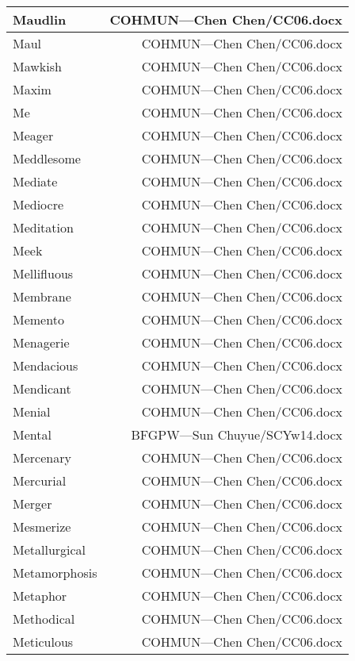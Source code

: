\documentclass{article}
\begin{document}
\begin{center}
\begin{longtable}{|l|r|}
\hline
Maudlin  &  COHMUN---Chen Chen/CC06.docx\\  
\hline
Maul  &  COHMUN---Chen Chen/CC06.docx\\  
\hline
Mawkish  &  COHMUN---Chen Chen/CC06.docx\\  
\hline
Maxim  &  COHMUN---Chen Chen/CC06.docx\\  
\hline
Me  &  COHMUN---Chen Chen/CC06.docx\\  
\hline
Meager  &  COHMUN---Chen Chen/CC06.docx\\  
\hline
Meddlesome  &  COHMUN---Chen Chen/CC06.docx\\  
\hline
Mediate  &  COHMUN---Chen Chen/CC06.docx\\  
\hline
Mediocre  &  COHMUN---Chen Chen/CC06.docx\\  
\hline
Meditation  &  COHMUN---Chen Chen/CC06.docx\\  
\hline
Meek  &  COHMUN---Chen Chen/CC06.docx\\  
\hline
Mellifluous  &  COHMUN---Chen Chen/CC06.docx\\  
\hline
Membrane  &  COHMUN---Chen Chen/CC06.docx\\  
\hline
Memento  &  COHMUN---Chen Chen/CC06.docx\\  
\hline
Menagerie  &  COHMUN---Chen Chen/CC06.docx\\  
\hline
Mendacious  &  COHMUN---Chen Chen/CC06.docx\\  
\hline
Mendicant  &  COHMUN---Chen Chen/CC06.docx\\  
\hline
Menial  &  COHMUN---Chen Chen/CC06.docx\\  
\hline
Mental  &  BFGPW---Sun Chuyue/SCYw14.docx\\  
\hline
Mercenary  &  COHMUN---Chen Chen/CC06.docx\\  
\hline
Mercurial  &  COHMUN---Chen Chen/CC06.docx\\  
\hline
Merger  &  COHMUN---Chen Chen/CC06.docx\\  
\hline
Mesmerize  &  COHMUN---Chen Chen/CC06.docx\\  
\hline
Metallurgical  &  COHMUN---Chen Chen/CC06.docx\\  
\hline
Metamorphosis  &  COHMUN---Chen Chen/CC06.docx\\  
\hline
Metaphor  &  COHMUN---Chen Chen/CC06.docx\\  
\hline
Methodical  &  COHMUN---Chen Chen/CC06.docx\\  
\hline
Meticulous  &  COHMUN---Chen Chen/CC06.docx\\  

\end{longtable}
\end{center}
\end{document}
